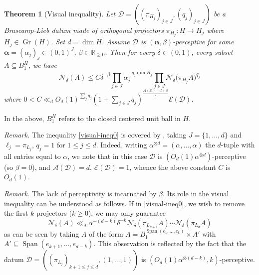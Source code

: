\documentclass[a4paper,english]{amsart}
\newtheorem{thm}{Theorem}[section]
\theoremstyle{definition}
\newenvironment{remark}{\par\medskip \noindent \textit{Remark.} \rmfamily}{\medskip}
\newcommand{\R}{\mathbb{R}}
\newcommand{\bba}{\boldsymbol{\alpha}}
\newcommand{\1}{\mathbbm{1}}
\newcommand{\cN} {{\mathcal N}}
\newcommand{\sD} {{\mathscr D}}
\newcommand{\sE}{\mathscr{E}}
\newcommand{\sA}{\mathscr{A}}
\DeclareMathOperator{\Span}{Span}
\DeclareMathOperator{\Gr}{Gr}
\renewcommand{\subset}{\subseteq}
\begin{document}
\begin{thm}[Visual inequality] \label{thm-visual-ineq}
Let $\sD=((\pi_{H_j})_{j\in J}, (q_{j})_{j\in J})$ be a Brascamp-Lieb datum made of orthogonal projectors $\pi_{H_j} : H \to H_j$ where $H_j \in \Gr(H)$.
Set $d = \dim H$.
Assume $\sD$ is $(\bba, \beta)$-perceptive for some $\bba = (\alpha_j)_{j} \in (0,1)^J$, $\beta\in \R_{\geq 0}$.
Then for every $\delta\in (0,1)$, every subset $A \subset B^H_{1}$, we have
\begin{equation} \label{eq-thm-visual-ineq}
\cN_{\delta}(A)\leq C \delta^{-\beta} \prod_{j \in J} \alpha_j^{-q_j \dim H_j} \prod_{j \in J} \cN_{\delta}\bigl(\pi_{H_{j}}A\bigr)^{q_{j}}
\end{equation}
where $0< C \ll_{d} O_{d}(1)^{\sum_{j}q_{j}}(1+\sum_{j \in J}q_{j})^{\frac{\sA(\sD)-d+\beta}{2}} \sE(\sD) $.
\end{thm}

In the above, $B^H_{1}$ refers to the closed centered unit ball in $H$.
\begin{remark}
The inequality \eqref{visual-ineq0} is covered by , taking $J=\{1, \dotsc, d\}$ and $\ell_{j}=\pi_{L_{j}}$, $q_{j}=1$ for $1\leq j\leq d$. Indeed, writing $\alpha^{\otimes d}=(\alpha, \dots, \alpha)$ the $d$-tuple with all entries equal to $\alpha$,  we note that in this case  $\sD$ is $(O_{d}(1)\alpha^{\otimes d})$-perceptive (so $\beta=0$), and $\sA(\sD)=d$, $\sE(\sD)=1$, whence the above constant $C$ is $O_{d}(1)$.
\end{remark}

\begin{remark}
The lack of perceptivity is incarnated by $\beta$. Its role in the visual inequality can be understood as follows.
If in \eqref{visual-ineq0}, we wish to remove the first $k$ projectors ($k \geq 0$), we may only guarantee
$$\cN_{\delta}(A)\ll_{d} \alpha^{-(d-k)} \delta^{-k}\cN_{\delta}(\pi_{L_{k+1}}A) \dotsm \cN_{\delta}(\pi_{L_{d}}A)$$
as can be seen by taking $A$ of the form $A=B^{\Span(e_{1}, \dots, e_{k})}_{1}\times A'$ with $A'\subseteq \Span(e_{k+1}, \dots, e_{d-k})$.
This observation is reflected by the fact that the datum $\sD=((\pi_{L_{j}})_{k+1\leq j\leq d}, (1, \dotsc, 1) )$ is $(O_{d}(1)\alpha^{\otimes (d-k)}, k)$-perceptive.
\end{remark}
\end{document}
